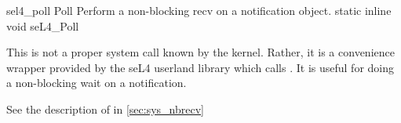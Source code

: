 %
%
%
%

\apidoc
{sel4_poll}
{Poll}
{Perform a non-blocking recv on a notification object.}
{static inline void seL4\_Poll}
{
}
{\noret}
{
This is not a proper system call
known by the kernel. Rather, it is a convenience
wrapper provided by the seL4 userland library which calls
. It is
useful for doing a non-blocking wait on a notification.

See the description of  in \autoref{sec:sys_nbrecv}
}
